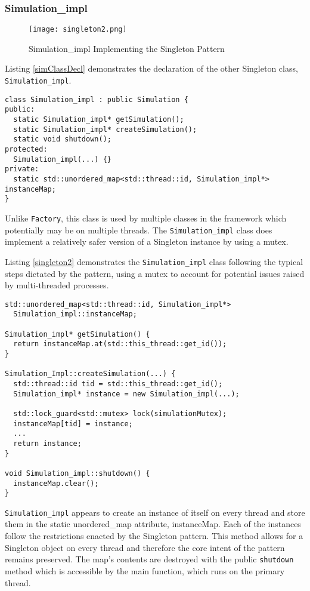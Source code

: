 \subsubsection{Simulation\_impl}

\begin{figure}[ht]
  \caption{Simulation\_impl Implementing the Singleton Pattern}
  \centering
  \texttt{[image: singleton2.png]}
\end{figure}

Listing \ref{simClassDecl} demonstrates the declaration of the other Singleton class, \texttt{Simulation\_impl}.

\begin{lstlisting}[style=customC++,label=simClassDecl,caption=Excerpt of Simulation\_impl Interface \\ File: src/sst/core/simulation\_impl.h]
class Simulation_impl : public Simulation {
public:
  static Simulation_impl* getSimulation();
  static Simulation_impl* createSimulation();
  static void shutdown();
protected:
  Simulation_impl(...) {}
private:
  static std::unordered_map<std::thread::id, Simulation_impl*> instanceMap;
}
\end{lstlisting}

Unlike \texttt{Factory}, this class is used by multiple classes in the framework which potentially may be on multiple threads. The \texttt{Simulation\_impl} class does implement a relatively safer version of a Singleton instance by using a mutex.

Listing \ref{singleton2} demonstrates the \texttt{Simulation\_impl} class following the typical steps dictated by the pattern, using a mutex to account for potential issues raised by multi-threaded processes.

\begin{lstlisting}[style=customC++,label=singleton2,caption=Simulation\_impl Implementing the Singleton Pattern \\ File: src/sst/core/simulation\_impl.cc]
std::unordered_map<std::thread::id, Simulation_impl*>
  Simulation_impl::instanceMap;

Simulation_impl* getSimulation() {
  return instanceMap.at(std::this_thread::get_id());
}

Simulation_Impl::createSimulation(...) {
  std::thread::id tid = std::this_thread::get_id();
  Simulation_impl* instance = new Simulation_impl(...);

  std::lock_guard<std::mutex> lock(simulationMutex);
  instanceMap[tid] = instance;
  ...
  return instance;
}

void Simulation_impl::shutdown() {
  instanceMap.clear();
}
\end{lstlisting}

\texttt{Simulation\_impl} appears to create an instance of itself on every thread and store them in the static unordered\_map attribute, instanceMap. Each of the instances follow the restrictions enacted by the Singleton pattern. This method allows for a Singleton object on every thread and therefore the core intent of the pattern remains preserved. The map's contents are destroyed with the public \texttt{shutdown} method which is accessible by the main function, which runs on the primary thread.
